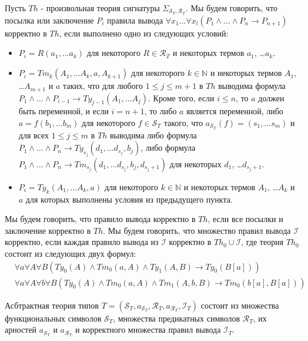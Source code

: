 \documentclass{amsart}
\theoremstyle{definition}
\theoremstyle{remark}
\numberwithin{figure}{section}
\begin{document}
Пусть $Th$ - произвольная теория сигнатуры $\Sigma_{\mathcal{S}_T, \mathcal{R}_T}$.
Мы будем говорить, что посылка или заключение $P_i$ правила вывода $\forall x_1 \ldots \forall x_l (P_1 \land \ldots \land P_n \to P_{n+1})$ корректно в $Th$, если выполнено одно из следующих условий:
\begin{itemize}
\item $P_i = R(a_1, \ldots a_k)$ для некоторого $R \in \mathcal{R}_T$ и некоторых термов $a_1$, \ldots $a_k$.
\item $P_i = Tm_k(A_1, \ldots A_k, a, A_{k + 1})$ для некоторого $k \in \mathbb{N}$ и некоторых термов $A_1$, \ldots $A_{m + 1}$ и $a$ таких, что для любого $1 \leq j \leq m + 1$ в $Th$ выводима формула $P_1 \land \ldots \land P_{i - 1} \to Ty_{j - 1}(A_1, \ldots A_j)$.
    Кроме того, если $i \leq n$, то $a$ должен быть переменной, и если $i = n + 1$, то либо $a$ является переменной, либо $a = f(b_1, \ldots b_m)$ для некоторого $f \in \mathcal{S}_T$ такого, что $a_{\mathcal{S}_T}(f) = (s_1, \ldots s_m)$ и для всех $1 \leq j \leq m$ в $Th$ выводима либо формула $P_1 \land \ldots \land P_n \to Ty_{s_j}(d_1, \ldots d_{s_j}, b_j)$, либо формула $P_1 \land \ldots \land P_n \to Tm_{s_j}(d_1, \ldots d_{s_j}, b_j, d_{s_j + 1})$ для некоторых $d_1$, \ldots $d_{s_j + 1}$.
\item $P_i = Ty_k(A_1, \ldots A_k, a)$ для некоторого $k \in \mathbb{N}$ и некоторых термов $A_1$, \ldots $A_k$ и $a$ для которых выполнены условия из предыдущего пункта.
\end{itemize}

Мы будем говорить, что правило вывода корректно в $Th$, если все посылки и заключение корректно в $Th$.
Мы будем говорить, что множество правил вывода $\mathcal{I}$ корректно, если каждая правило вывода из $\mathcal{I}$ корректно в $Th_0 \cup \mathcal{I}$, где теория $Th_0$ состоит из следующих двух формул:
\begin{align*}
& \forall a \forall A \forall B (Ty_0(A) \land Tm_0(a, A) \land Ty_1(A, B) \to Ty_0(B[a])) \\
& \forall a \forall A \forall b \forall B (Ty_0(A) \land Tm_0(a, A) \land Tm_1(A, b, B) \to Tm_0(b[a], B[a]))
\end{align*}

\begin{defn}
Асбтрактная теория типов $T = (\mathcal{S}_T, a_{\mathcal{S}_T}, \mathcal{R}_T, a_{\mathcal{R}_T}, \mathcal{I}_T)$ состоит из множества функциональных символов $\mathcal{S}_T$, множества предикатных символов $\mathcal{R}_T$, их арностей $a_{\mathcal{S}_T}$ и $a_{\mathcal{R}_T}$ и корректного множества правил вывода $\mathcal{I}_T$.
\end{defn}
\end{document}
